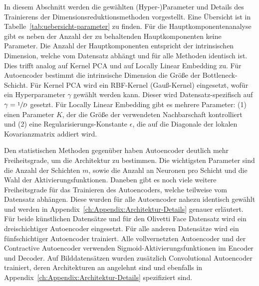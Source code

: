 In diesem Abschnitt werden die gewählten (Hyper-)Parameter und Details des Trainierens der
Dimensionsreduktionsmethoden vorgestellt. Eine Übersicht ist in
Tabelle~\ref{tab:uebersicht-parameter} zu finden. Für die Hauptkomponentenanalyse gibt es neben der
Anzahl der zu behaltenden Hauptkomponenten keine Parameter. Die Anzahl der Hauptkomponenten
entspricht der intrinsischen Dimension, welche vom Datensatz abhängt und für alle Methoden
identisch ist. Dies trifft analog auf Kernel PCA und auf Locally Linear Embedding zu. Für
Autoencoder bestimmt die intrinsische Dimension die Größe der Bottleneck-Schicht. Für Kernel PCA
wird ein RBF-Kernel (Gauß-Kernel) eingesetzt, wofür ein Hyperparameter $\gamma$ gewählt werden
kann. Dieser wird Datensatz-spezifisch auf $\gamma = \sfrac{1}{D}$ gesetzt. Für Locally Linear
Embedding gibt es mehrere Parameter: (1) einen Parameter $K$, der die Größe der verwendeten
Nachbarschaft kontrolliert und (2) eine Regularisierungs-Konstante $\epsilon$, die auf die
Diagonale der lokalen Kovarianzmatrix addiert wird.

Den statistischen Methoden gegenüber haben Autoencoder deutlich mehr Freiheitsgrade, um die
Architektur zu bestimmen. Die wichtigsten Parameter sind die Anzahl der Schichten $m$, sowie die
Anzahl an Neuronen pro Schicht und die Wahl der Aktivierungsfunktionen. Daneben gibt es noch viele
weitere Freiheitsgrade für das Trainieren des Autoencoders, welche teilweise vom Datensatz
abhängen. Diese wurden für alle Autoencoder nahezu identisch gewählt und werden in
Appendix~\ref{ch:Appendix:Architektur-Details} genauer erläutert. Für beide künstlichen Datensätze
und für den Olivetti Face Datensatz wird ein dreischichtiger Autoencoder eingesetzt. Für alle
anderen Datensätze wird ein fünfschichtiger Autoencoder trainiert. Alle vollvernetzten Autoencoder
und der Contractive Autoencoder verwenden Sigmoid-Aktivierungsfunktionen im Encoder und Decoder.
Auf Bilddatensätzen wurden zusätzlich Convolutional Autoencoder trainiert, deren Architekturen an
\textcite[14]{Ghosh.2019} angelehnt sind und ebenfalls in
Appendix~\ref{ch:Appendix:Architektur-Details} spezifiziert sind.

